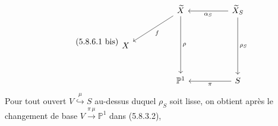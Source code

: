 \begin{equation}\tag{5.8.6.1 bis}
\begin{tikzcd}[column sep=huge, row sep=large]
 {} & \widetilde{X} \arrow[dl, "f"] \arrow[dd, "\rho"] & \widetilde{X}_S \arrow[l, "\alpha_S"] \arrow[dd, "\rho_S"] \\
X & {} & {} \\
 {} & \mathbb{P}^1 & S \arrow[l, "\pi"]
\end{tikzcd}
\end{equation}
Pour tout ouvert $V \overset{\mu}{\hookrightarrow} S$ au-dessus duquel $\rho_S$ soit lisse, on obtient après le changement de base $V \overset{\pi\,\mu}{\longrightarrow} \mathbb{P}^1$ dans (5.8.3.2), 

